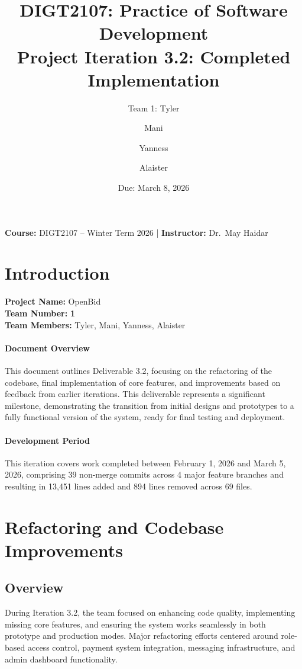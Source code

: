 \documentclass[11pt]{article}
\title{DIGT2107: Practice of Software Development\\
\Large Project Iteration 3.2: Completed Implementation\\[4pt]
\large \product}
\author{Team 1: Tyler \and Mani \and Yanness \and Alaister}
\date{Due: March 8, 2026}
\newcommand{\product}{OpenBid}
\begin{document}
\maketitle

\begin{center}
\textbf{Course:} DIGT2107 -- Winter Term 2026 \quad|\quad
\textbf{Instructor:} Dr.\ May Haidar
\end{center}

\newpage

\section{Introduction}
\textbf{Project Name:} \product \\
\textbf{Team Number:} \textbf{1} \\
\textbf{Team Members:} Tyler, Mani, Yanness, Alaister

\paragraph{Document Overview}
This document outlines Deliverable 3.2, focusing on the refactoring of the codebase, final implementation of core features, and improvements based on feedback from earlier iterations. This deliverable represents a significant milestone, demonstrating the transition from initial designs and prototypes to a fully functional version of the system, ready for final testing and deployment.

\paragraph{Development Period}
This iteration covers work completed between February 1, 2026 and March 5, 2026, comprising 39 non-merge commits across 4 major feature branches and resulting in 13,451 lines added and 894 lines removed across 69 files.

\section{Refactoring and Codebase Improvements}

\subsection{Overview}
During Iteration 3.2, the team focused on enhancing code quality, implementing missing core features, and ensuring the system works seamlessly in both prototype and production modes. Major refactoring efforts centered around role-based access control, payment system integration, messaging infrastructure, and admin dashboard functionality.
\end{document}
